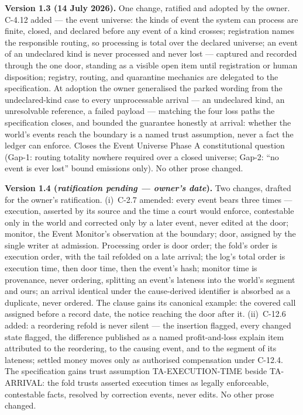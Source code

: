 \documentclass[11pt,a4paper]{article}
\begin{document}
\textbf{Version 1.3 (14 July 2026).} One change, ratified and adopted
by the owner. C-4.12 added --- the event universe: the kinds of event
the system can process are finite, closed, and declared before any
event of a kind crosses; registration names the responsible routing,
so processing is total over the declared universe; an event of an
undeclared kind is never processed and never lost --- captured and
recorded through the one door, standing as a visible open item until
registration or human disposition; registry, routing, and quarantine
mechanics are delegated to the specification. At adoption the owner
generalised the parked wording from the undeclared-kind case to every
unprocessable arrival --- an undeclared kind, an unresolvable
reference, a failed payload --- matching the four loss paths the
specification closes, and bounded the guarantee honestly at arrival:
whether the world's events reach the boundary is a named trust
assumption, never a fact the ledger can enforce. Closes the Event
Universe Phase A constitutional question (Gap-1: routing totality
nowhere required over a closed universe; Gap-2: ``no event is ever
lost'' bound emissions only). No other prose changed.

\textbf{Version 1.4 (\emph{ratification pending --- owner's date}).}
Two changes, drafted for the owner's ratification. (i)~C-2.7 amended:
every event bears three times --- execution, asserted by its source and
the time a court would enforce, contestable only in the world and
corrected only by a later event, never edited at the door; monitor, the
Event Monitor's observation at the boundary; door, assigned by the
single writer at admission. Processing order is door order; the fold's
order is execution order, with the tail refolded on a late arrival; the
log's total order is execution time, then door time, then the event's
hash; monitor time is provenance, never ordering, splitting an event's
lateness into the world's segment and ours; an arrival identical under
the cause-derived identifier is absorbed as a duplicate, never ordered.
The clause gains its canonical example: the covered call assigned
before a record date, the notice reaching the door after it.
(ii)~C-12.6 added: a reordering refold is never silent --- the
insertion flagged, every changed state flagged, the difference
published as a named profit-and-loss explain item attributed to the
reordering, to the causing event, and to the segment of its lateness;
settled money moves only as authorised compensation under C-12.4. The
specification gains trust assumption TA-EXECUTION-TIME beside
TA-ARRIVAL: the fold trusts asserted execution times as legally
enforceable, contestable facts, resolved by correction events, never
edits. No other prose changed.
\end{document}
